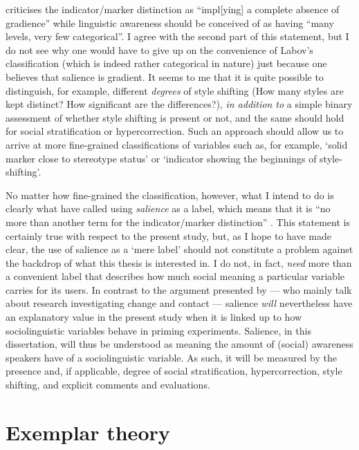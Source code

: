 \textcite[6]{racz2013} criticises the indicator/marker distinction as ``impl[ying] a complete absence of gradience'' while linguistic awareness should be conceived of as having ``many levels, very few categorical''.
I agree with the second part of this statement, but I do not see why one would have to give up on the convenience of Labov's classification (which is indeed rather categorical in nature) just because one believes that salience is gradient.
It seems to me that it is quite possible to distinguish, for example, different \emph{degrees} of style shifting (How many styles are kept distinct? How significant are the differences?), \emph{in addition to} a simple binary assessment of whether style shifting is present or not, and the same should hold for social stratification or hypercorrection.
Such an approach should allow us to arrive at more fine-grained classifications of variables such as, for example, `solid marker close to stereotype status' or `indicator showing the beginnings of style-shifting'.

No matter how fine-grained the classification, however, what I intend to do is clearly what \textcite{kerswillwilliams2002} have called using \emph{salience} as a label, which means that it is ``no more than another term for the indicator/marker distinction'' \parencite[32]{racz2013}.
This statement is certainly true with respect to the present study, but, as I hope to have made clear, the use of salience as a `mere label' should not constitute a problem against the backdrop of what this thesis is interested in.
I do not, in fact, \emph{need} more than a convenient label that describes how much social meaning a particular variable carries for its users.
In contrast to the argument presented by \textcite{kerswillwilliams2002} --- who mainly talk about research investigating change and contact --- salience \emph{will} nevertheless have an explanatory value in the present study when it is linked up to how sociolinguistic variables behave in priming experiments.
Salience, in this dissertation, will thus be understood as meaning the amount of (social) awareness speakers have of a sociolinguistic variable.
As such, it will be measured by the presence and, if applicable, degree of social stratification, hypercorrection, style shifting, and explicit comments and evaluations.

	\section{Exemplar theory}
	\label{sec.sal.exemplar}

